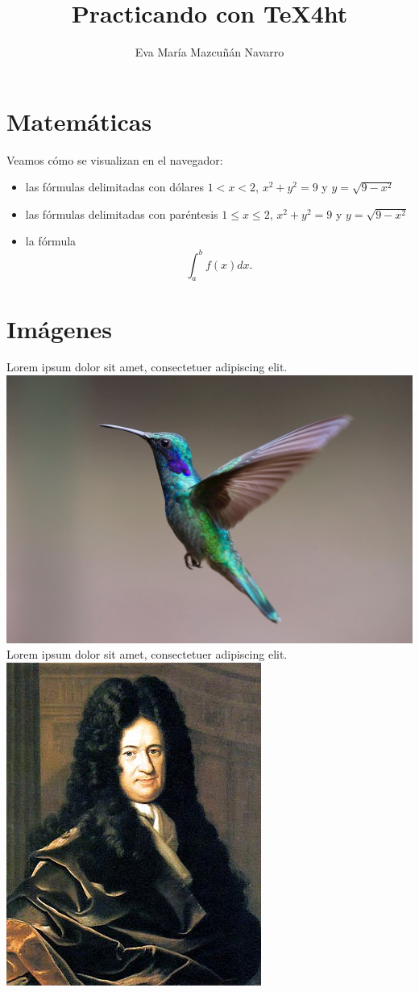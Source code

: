 \documentclass[12pt,a4paper,twoside]{article}
\title{Practicando con \TeX4ht{}}
\author{Eva María Mazcuñán Navarro}
\begin{document}
\maketitle


\section{Matemáticas}
Veamos cómo se visualizan en el navegador:

\begin{itemize}
	\item las fórmulas delimitadas con dólares $1<x<2$, $x^2+y^2=9$ y $y=\sqrt{9-x^2}$
	
	\item las fórmulas delimitadas con paréntesis \(1\le x \le 2\), \(x^2+y^2=9\) y  \(y=\sqrt{9-x^2}\)
	
	\item la fórmula \[\int_a^b f(x)dx.\]
\end{itemize}

\section{Imágenes}

\noindent Lorem ipsum dolor sit amet, consectetuer adipiscing elit.\\
\noindent\includegraphics[width=.4\textwidth]{images/bird.jpg}\\
\noindent Lorem ipsum dolor sit amet, consectetuer adipiscing elit.\\
\noindent\includegraphics[width=.4\textwidth]{images/GWLeibniz.png}
\end{document}
